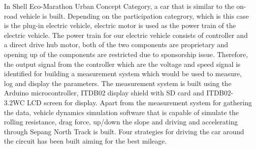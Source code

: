 \begin{EnAbstract}

In Shell Eco-Marathon Urban Concept Category, a car that is similar to the on-road vehicle is built. Depending on the participation categrory, which is this case is the plug-in electric vehicle, electric motor is used as the power train of the electric vehicle. The power train for our electric vehicle consists of controller and a direct drive hub motor, both of the two components are proprietary and opening up of the components are restricted due to sponsorship issue. Therefore, the output signal from the controller which are the voltage and speed signal is identified for building a measurement system which would be used to measure, log and display the parameters. The measurement system is built using the Arduino microcontroller, ITDB02 display shield with SD card and ITDB02-3.2WC LCD screen for display. Apart from the measurement system for gathering the data, vehicle dynamics simulation software that is capable of simulate the rolling resistance, drag force, up/down the slope and driving and accelerating through Sepang North Track is built. Four strategies for driving the car around the circuit has been built aiming for the best mileage.  

\end{EnAbstract}
